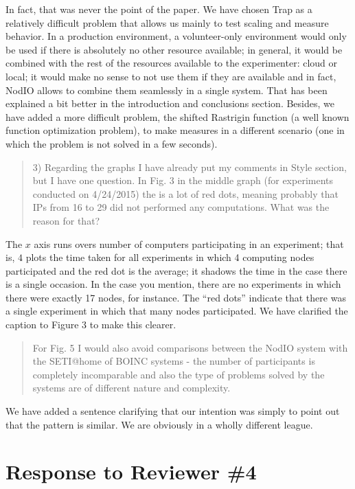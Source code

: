 \documentclass[preprint]{elsarticle}
\begin{document}
In fact, that was never the point of the paper. We have chosen Trap as
a relatively difficult problem that allows us mainly to test scaling
and measure behavior. In a production environment, a volunteer-only
environment would only be used if there is absolutely no other
resource available; in general, it would be combined with the rest of
the resources available to the experimenter: cloud or local; it would
make no sense to not use them if they are available and in fact, NodIO
allows to combine them seamlessly in a single system. That has been
explained a bit better in the introduction and conclusions
section. Besides, we have added a more difficult problem, the shifted
Rastrigin function (a well known function optimization problem), to make 
measures in a different scenario (one in which the problem is not solved 
in a few seconds). 

\begin{quote}
3) Regarding the graphs I have already put my comments in Style section, but I have one question. In
Fig. 3 in the middle graph (for experiments conducted on 4/24/2015) the is a lot of red dots,
meaning probably that IPs from 16 to 29 did not performed any computations. What was the reason
for that?
\end{quote}

The $x$ axis runs overs number of computers participating in an
experiment; that is, $4$ plots the time taken for all experiments in
which 4 computing nodes participated and the red dot is the average;
it shadows the time in the case there is a single occasion. In the
case you mention, there are no experiments in which there were exactly
17 nodes, for instance. The ``red dots'' indicate that there was a
single experiment in which that many nodes participated. We have
clarified the caption to Figure 3 to make this clearer. 

\begin{quote}
For Fig. 5 I would also avoid comparisons between the NodIO system with the SETI@home of BOINC
systems - the number of participants is completely incomparable and also the type of problems
solved by the systems are of different nature and complexity.
\end{quote}

We have added a sentence clarifying that our intention was simply to
point out that the pattern is similar. We are obviously in a wholly
different league.

\section{Response to Reviewer \#4}
\end{document}
